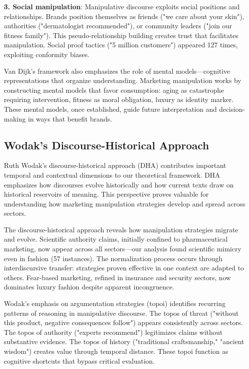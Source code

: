 \textbf{3. Social manipulation}: Manipulative discourse exploits social positions and relationships. Brands position themselves as friends ("we care about your skin"), authorities ("dermatologist recommended"), or community leaders ("join our fitness family"). This pseudo-relationship building creates trust that facilitates manipulation. Social proof tactics ("5 million customers") appeared 127 times, exploiting conformity biases.

Van Dijk's framework also emphasizes the role of mental models—cognitive representations that organize understanding. Marketing manipulation works by constructing mental models that favor consumption: aging as catastrophe requiring intervention, fitness as moral obligation, luxury as identity marker. These mental models, once established, guide future interpretation and decision-making in ways that benefit brands.

\subsection{Wodak's Discourse-Historical Approach}

Ruth Wodak's discourse-historical approach (DHA) contributes important temporal and contextual dimensions to our theoretical framework. DHA emphasizes how discourses evolve historically and how current texts draw on historical reservoirs of meaning. This perspective proves valuable for understanding how marketing manipulation strategies develop and spread across sectors.

The discourse-historical approach reveals how manipulation strategies migrate and evolve. Scientific authority claims, initially confined to pharmaceutical marketing, now appear across all sectors—our analysis found scientific mimicry even in fashion (57 instances). The normalization process occurs through interdiscursive transfer: strategies proven effective in one context are adapted to others. Fear-based marketing, refined in insurance and security sectors, now dominates luxury fashion despite apparent incongruence.

Wodak's emphasis on argumentation strategies (topoi) identifies recurring patterns of reasoning in manipulative discourse. The topos of threat ("without this product, negative consequences follow") appears consistently across sectors. The topos of authority ("experts recommend") legitimizes claims without substantive evidence. The topos of history ("traditional craftsmanship," "ancient wisdom") creates value through temporal distance. These topoi function as cognitive shortcuts that bypass critical evaluation.

